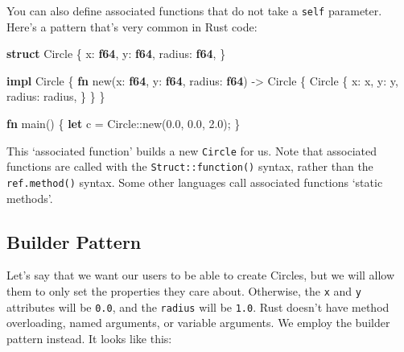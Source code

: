 \documentclass[a4paper,]{book}
\newenvironment{Shaded}{\begin{snugshade}}{\end{snugshade}}
\newcommand{\KeywordTok}[1]{\textcolor[rgb]{0.13,0.29,0.53}{\textbf{{#1}}}}
\newcommand{\DecValTok}[1]{\textcolor[rgb]{0.00,0.00,0.81}{{#1}}}
\newcommand{\NormalTok}[1]{{#1}}
\begin{document}
You can also define associated functions that do not take a
\texttt{self} parameter. Here's a pattern that's very common in Rust
code:

\begin{Shaded}
\begin{Highlighting}[]
\KeywordTok{struct} \NormalTok{Circle \{}
    \NormalTok{x: }\KeywordTok{f64}\NormalTok{,}
    \NormalTok{y: }\KeywordTok{f64}\NormalTok{,}
    \NormalTok{radius: }\KeywordTok{f64}\NormalTok{,}
\NormalTok{\}}

\KeywordTok{impl} \NormalTok{Circle \{}
    \KeywordTok{fn} \NormalTok{new(x: }\KeywordTok{f64}\NormalTok{, y: }\KeywordTok{f64}\NormalTok{, radius: }\KeywordTok{f64}\NormalTok{) -> Circle \{}
        \NormalTok{Circle \{}
            \NormalTok{x: x,}
            \NormalTok{y: y,}
            \NormalTok{radius: radius,}
        \NormalTok{\}}
    \NormalTok{\}}
\NormalTok{\}}

\KeywordTok{fn} \NormalTok{main() \{}
    \KeywordTok{let} \NormalTok{c = Circle::new(}\DecValTok{0.0}\NormalTok{, }\DecValTok{0.0}\NormalTok{, }\DecValTok{2.0}\NormalTok{);}
\NormalTok{\}}
\end{Highlighting}
\end{Shaded}

This `associated function' builds a new \texttt{Circle} for us. Note
that associated functions are called with the
\texttt{Struct::function()} syntax, rather than the
\texttt{ref.method()} syntax. Some other languages call associated
functions `static methods'.

\subsection{Builder Pattern}\label{builder-pattern}

Let's say that we want our users to be able to create Circles, but we
will allow them to only set the properties they care about. Otherwise,
the \texttt{x} and \texttt{y} attributes will be \texttt{0.0}, and the
\texttt{radius} will be \texttt{1.0}. Rust doesn't have method
overloading, named arguments, or variable arguments. We employ the
builder pattern instead. It looks like this:
\end{document}
